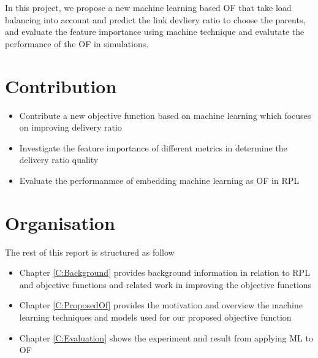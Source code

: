 In this project, we propose a new machine learning based OF that take
load balancing into account and predict the link devliery ratio to
choose the parents, and evaluate the feature importance using machine
technique and evalutate the performance of the OF in simulations.

\section{Contribution}
\begin{itemize}
    \item Contribute a new objective function based on machine
        learning which focuses on improving delivery ratio
    \item Investigate the feature importance of different metrics in
        determine the delivery ratio quality
    \item Evaluate the performanmce of embedding machine learning as OF in RPL
\end{itemize}

\section{Organisation}
The rest of this report is structured as follow
\begin{itemize}
    \item Chapter \ref{C:Background} provides background information
        in relation to RPL and objective functions and related work
        in improving the objective functions
    \item Chapter \ref{C:ProposedOf} provides the motivation and overview
        the machine learning techniques and models used for our
        proposed objective function
    \item Chapter \ref{C:Evaluation} shows the experiment and result
        from applying ML to OF
\end{itemize}
